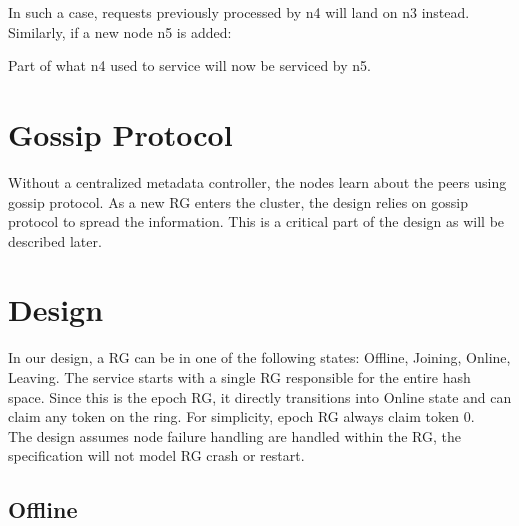 In such a case, requests previously processed by n4 will land on n3 instead.
Similarly, if a new node n5 is added:

\begin{center}
\end{center}

Part of what n4 used to service will now be serviced by n5.

\section{Gossip Protocol}

Without a centralized metadata controller, the nodes learn about the peers using
gossip protocol. As a new RG enters the cluster, the design relies on gossip
protocol to spread the information. This is a critical part of the design as
will be described later.

\section{Design}

In our design, a RG can be in one of the following states: Offline, Joining,
Online, Leaving. The service starts with a single RG responsible for the entire
hash space. Since this is the epoch RG, it directly transitions into Online
state and can claim any token on the ring. For simplicity, epoch RG always claim
token 0.\\

The design assumes node failure handling are handled within the RG, the
specification will not model RG crash or restart. 

\subsection{Offline}

